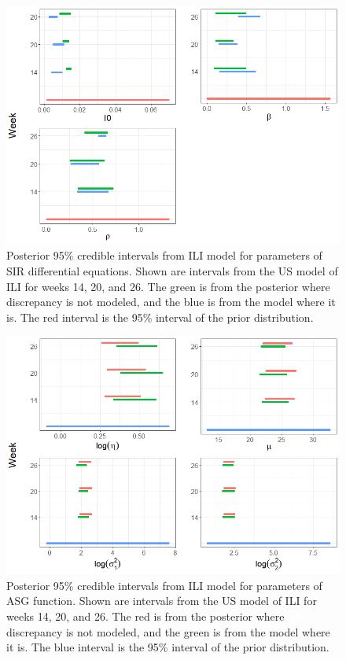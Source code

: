 \documentclass[ba]{imsart}
\theoremstyle{plain}
\theoremstyle{definition}
\theoremstyle{remark}
\begin{document}
\begin{supplement}
\begin{figure}[hbt!]
    \centering
    \includegraphics[scale=.6]{Images/posterior_theta_sir.png}
    \caption{Posterior 95\% credible intervals from ILI model for parameters of SIR differential equations. Shown are intervals from the US model of ILI for weeks 14, 20, and 26. The green is from the posterior where discrepancy is not modeled, and the blue is from the model where it is. The red interval is the 95\% interval of the prior distribution.}
    \label{fig:posterior_theta_sir}
\end{figure}

\begin{figure}[hbt!]
    \centering
    \includegraphics[scale=.6]{Images/posterior_theta.png}
    \caption{Posterior 95\% credible intervals from ILI model for parameters of ASG function. Shown are intervals from the US model of ILI for weeks 14, 20, and 26. The red is from the posterior where discrepancy is not modeled, and the green is from the model where it is. The blue interval is the 95\% interval of the prior distribution.}
    \label{fig:posterior_theta}
\end{figure}



\end{supplement}
\end{document}
